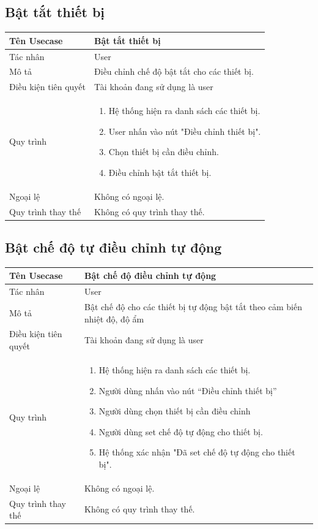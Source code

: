 \subsection{Bật tắt thiết bị}
\begin{center}
	\begin{tabular}{|p{4cm}|p{10cm}|}
		\hline
		Tên Usecase & Bật tắt thiết bị\\ \hline
		Tác nhân & User\\ \hline
		Mô tả & Điều chỉnh chế độ bật tắt cho các thiết bị.
		\\ \hline
		Điều kiện tiên quyết & Tài khoản đang sử dụng là user \\ \hline
		Quy trình & \begin{enumerate}
			\item Hệ thống hiện ra danh sách các thiết bị.
			\item User nhấn vào nút "Điều chỉnh thiết bị".
			\item Chọn thiết bị cần điều chỉnh.
			\item Điều chỉnh bật tắt thiết bị.
		\end{enumerate} \\ \hline
		Ngoại lệ & Không có ngoại lệ. \\ \hline
		Quy trình thay thế & Không có quy trình thay thế. \\ \hline
		
	\end{tabular}
\end{center}
\subsection{Bật chế độ tự điều chỉnh tự động}
\begin{center}
	\begin{tabular}{|p{4cm}|p{10cm}|}
		\hline
		Tên Usecase & Bật chế độ điều chỉnh tự động\\ \hline
		Tác nhân & User\\ \hline
		Mô tả & Bật chế độ cho các thiết bị tự động bật tắt theo cảm biến nhiệt độ, độ ẩm
		\\ \hline
		Điều kiện tiên quyết & Tài khoản đang sử dụng là user \\ \hline
		Quy trình & \begin{enumerate}
			\item Hệ thống hiện ra danh sách các thiết bị.
			\item Người dùng nhấn vào nút “Điều chỉnh thiết bị”
			\item Người dùng chọn thiết bị cần điều chỉnh
			\item Người dùng set chế độ tự động cho thiết bị.
			\item Hệ thống xác nhận "Đã set chế độ tự động cho thiết bị".	
		\end{enumerate} \\ \hline
		Ngoại lệ & Không có ngoại lệ. \\ \hline
		Quy trình thay thế & Không có quy trình thay thế. \\ \hline
		
	\end{tabular}
\end{center}

